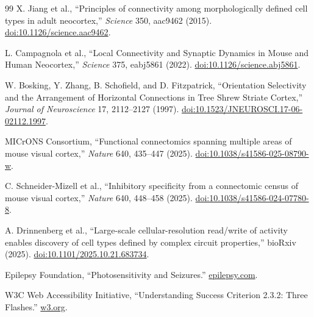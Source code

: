 \documentclass[11pt]{article}
\begin{document}
\begin{thebibliography}{99}
X. Jiang et al.,
``Principles of connectivity among morphologically defined cell types in
adult neocortex,'' \emph{Science} 350, aac9462 (2015).
\href{https://doi.org/10.1126/science.aac9462}{doi:10.1126/science.aac9462}.

L. Campagnola et al.,
``Local Connectivity and Synaptic Dynamics in Mouse and Human Neocortex,''
\emph{Science} 375, eabj5861 (2022).
\href{https://doi.org/10.1126/science.abj5861}{doi:10.1126/science.abj5861}.

W. Bosking, Y. Zhang, B. Schofield, and D. Fitzpatrick,
``Orientation Selectivity and the Arrangement of Horizontal Connections in
Tree Shrew Striate Cortex,'' \emph{Journal of Neuroscience} 17, 2112--2127
(1997).
\href{https://doi.org/10.1523/JNEUROSCI.17-06-02112.1997}{doi:10.1523/JNEUROSCI.17-06-02112.1997}.

MICrONS Consortium,
``Functional connectomics spanning multiple areas of mouse visual cortex,''
\emph{Nature} 640, 435--447 (2025).
\href{https://doi.org/10.1038/s41586-025-08790-w}{doi:10.1038/s41586-025-08790-w}.

C. Schneider-Mizell et al.,
``Inhibitory specificity from a connectomic census of mouse visual cortex,''
\emph{Nature} 640, 448--458 (2025).
\href{https://doi.org/10.1038/s41586-024-07780-8}{doi:10.1038/s41586-024-07780-8}.

A. Drinnenberg et al.,
``Large-scale cellular-resolution read/write of activity enables discovery
of cell types defined by complex circuit properties,'' bioRxiv (2025).
\href{https://doi.org/10.1101/2025.10.21.683734}{doi:10.1101/2025.10.21.683734}.

Epilepsy Foundation,
``Photosensitivity and Seizures.''
\href{https://go.epilepsy.com/what-is-epilepsy/seizure-triggers/photosensitivity}{epilepsy.com}.

W3C Web Accessibility Initiative,
``Understanding Success Criterion 2.3.2: Three Flashes.''
\href{https://www.w3.org/WAI/WCAG21/Understanding/three-flashes}{w3.org}.

\end{thebibliography}
\end{document}
